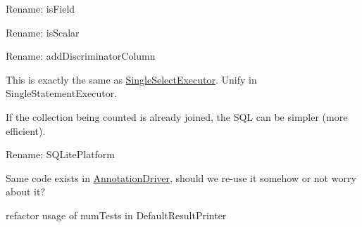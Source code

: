 \begin{DoxyRefList}
%
Rename\+: is\+Field  
\item[Global \mbox{\hyperlink{class_doctrine_1_1_o_r_m_1_1_query_1_1_result_set_mapping_aab77830b56c4c7353cea85de0b309481}{Result\+Set\+Mapping\+::is\+Scalar\+Result}} (\$column\+Name)]\label{todo__todo000036}%
%
Rename\+: is\+Scalar  
\item[Global \mbox{\hyperlink{class_doctrine_1_1_o_r_m_1_1_query_1_1_result_set_mapping_a05d6eab380c65f42741415904c192ab0}{Result\+Set\+Mapping\+::set\+Discriminator\+Column}} (\$alias, \$discr\+Column)]\label{todo__todo000030}%
%
Rename\+: add\+Discriminator\+Column  
\item[Class \mbox{\hyperlink{class_doctrine_1_1_o_r_m_1_1_query_1_1_exec_1_1_single_table_delete_update_executor}{Single\+Table\+Delete\+Update\+Executor}} ]\label{todo__todo000026}%
%
This is exactly the same as \mbox{\hyperlink{class_doctrine_1_1_o_r_m_1_1_query_1_1_exec_1_1_single_select_executor}{Single\+Select\+Executor}}. Unify in Single\+Statement\+Executor.  
\item[Global \mbox{\hyperlink{class_doctrine_1_1_o_r_m_1_1_query_1_1_a_s_t_1_1_functions_1_1_size_function_afedee95704ce796dd30e5d9e189a29e9}{Size\+Function\+::get\+Sql}} (\mbox{\hyperlink{class_doctrine_1_1_o_r_m_1_1_query_1_1_sql_walker}{Sql\+Walker}} \$sql\+Walker)]\label{todo__todo000024}%
%
If the collection being counted is already joined, the SQL can be simpler (more efficient).  
\item[Class \mbox{\hyperlink{class_doctrine_1_1_d_b_a_l_1_1_platforms_1_1_sqlite_platform}{Sqlite\+Platform}} ]\label{todo__todo000002}%
%
Rename\+: SQLite\+Platform  
\item[Global \mbox{\hyperlink{class_doctrine_1_1_persistence_1_1_mapping_1_1_driver_1_1_static_p_h_p_driver_a1079716efc88aab78c6f1d0d44d6354e}{Static\+PHPDriver\+::get\+All\+Class\+Names}} ()]\label{todo__todo000042}%
%
Same code exists in \mbox{\hyperlink{class_doctrine_1_1_persistence_1_1_mapping_1_1_driver_1_1_annotation_driver}{Annotation\+Driver}}, should we re-\/use it somehow or not worry about it?  
\item[Global \mbox{\hyperlink{class_p_h_p_unit_1_1_framework_1_1_test_suite_ac751e87b3d4c4bf2feb03bee8b092755}{Test\+Suite\+::count}} ()]\label{todo__todo000047}%
%
refactor usage of num\+Tests in Default\+Result\+Printer  

\end{DoxyRefList}
